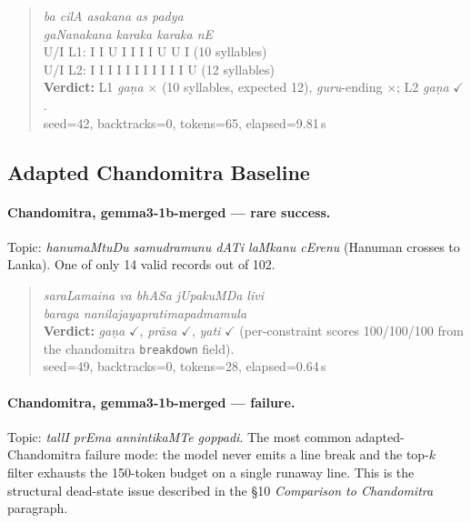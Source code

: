 \documentclass[11pt]{article}
\begin{document}
\begin{quote}
\textit{ba cilA asakana as padya} \\
\textit{gaNanakana karaka karaka nE} \\
\textsc{U/I L1:} I I U I I I I U U I \quad (10 syllables) \\
\textsc{U/I L2:} I I I I I I I I I I I U \quad (12 syllables) \\
\textbf{Verdict:} L1 \textit{ga\d{n}a} $\times$ (10 syllables, expected 12),
\textit{guru}-ending $\times$;
L2 \textit{ga\d{n}a} $\checkmark$.
\\ {\footnotesize seed=42, backtracks=0, tokens=65, elapsed=9.81\,s}
\end{quote}

\subsection{Adapted Chandomitra Baseline}
\label{app:examples_chandomitra}

\paragraph{Chandomitra, gemma3-1b-merged --- rare success.}
Topic: \textit{hanumaMtuDu samudramunu dATi laMkanu cErenu}
(Hanuman crosses to Lanka). One of only 14 valid records out of 102.

\begin{quote}
\textit{saraLamaina va bhASa jUpakuMDa livi} \\
\textit{baraga nanilajayapratimapadmamula} \\
\textbf{Verdict:} \textit{ga\d{n}a} $\checkmark$,
\textit{pr\={a}sa} $\checkmark$, \textit{yati} $\checkmark$
(per-constraint scores 100/100/100 from the chandomitra
\texttt{breakdown} field).
\\ {\footnotesize seed=49, backtracks=0, tokens=28, elapsed=0.64\,s}
\end{quote}

\paragraph{Chandomitra, gemma3-1b-merged --- failure.}
Topic: \textit{tallI prEma annintikaMTe goppadi}. The most common
adapted-Chandomitra failure mode: the model never emits a line break
and the top-$k$ filter exhausts the 150-token budget on a single
runaway line. This is the structural dead-state issue described in
the §10 \emph{Comparison to Chandomitra} paragraph.
\end{document}
